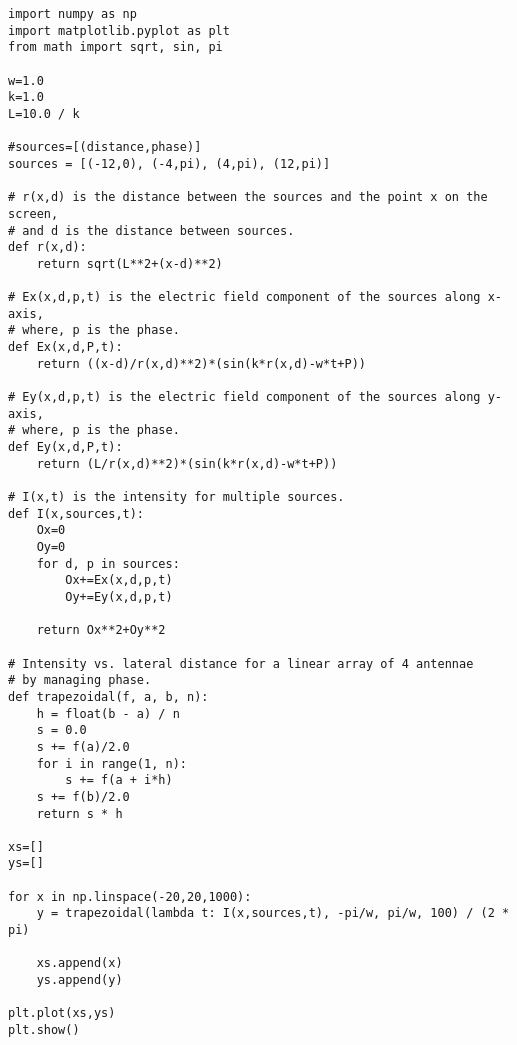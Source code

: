 \begin{Verbatim}[fontsize=\small,baselinestretch=0.9]
import numpy as np
import matplotlib.pyplot as plt
from math import sqrt, sin, pi

w=1.0
k=1.0
L=10.0 / k

#sources=[(distance,phase)]
sources = [(-12,0), (-4,pi), (4,pi), (12,pi)]

# r(x,d) is the distance between the sources and the point x on the screen,
# and d is the distance between sources.
def r(x,d):
    return sqrt(L**2+(x-d)**2)
    
# Ex(x,d,p,t) is the electric field component of the sources along x-axis,
# where, p is the phase.
def Ex(x,d,P,t):
    return ((x-d)/r(x,d)**2)*(sin(k*r(x,d)-w*t+P))
   
# Ey(x,d,p,t) is the electric field component of the sources along y-axis,
# where, p is the phase.
def Ey(x,d,P,t):
    return (L/r(x,d)**2)*(sin(k*r(x,d)-w*t+P))
 
# I(x,t) is the intensity for multiple sources.
def I(x,sources,t):
    Ox=0
    Oy=0
    for d, p in sources:
        Ox+=Ex(x,d,p,t)
        Oy+=Ey(x,d,p,t)
    
    return Ox**2+Oy**2
        
# Intensity vs. lateral distance for a linear array of 4 antennae
# by managing phase.
def trapezoidal(f, a, b, n):
    h = float(b - a) / n
    s = 0.0
    s += f(a)/2.0
    for i in range(1, n):
        s += f(a + i*h)
    s += f(b)/2.0
    return s * h

xs=[]
ys=[]

for x in np.linspace(-20,20,1000):
    y = trapezoidal(lambda t: I(x,sources,t), -pi/w, pi/w, 100) / (2 * pi)
   
    xs.append(x)
    ys.append(y)

plt.plot(xs,ys)
plt.show()
\end{Verbatim}
